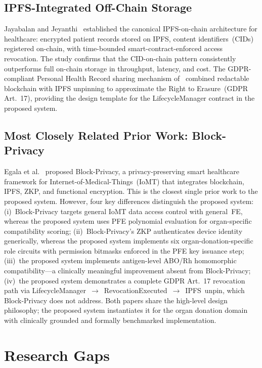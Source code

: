 \documentclass[10pt,twocolumn,a4paper]{article}
\begin{document}
\subsection{IPFS-Integrated Off-Chain Storage}

Jayabalan and Jeyanthi~\cite{jayabalan2022} established the canonical IPFS-on-chain
architecture for healthcare: encrypted patient records stored on IPFS, content
identifiers~(CIDs) registered on-chain, with time-bounded smart-contract-enforced
access revocation. The study confirms that the CID-on-chain pattern consistently
outperforms full on-chain storage in throughput, latency, and cost. The
GDPR-compliant Personal Health Record sharing mechanism of~\cite{gdprtdsc2023}
combined redactable blockchain with IPFS unpinning to approximate the Right to
Erasure~(GDPR Art.~17), providing the design template for the LifecycleManager
contract in the proposed system.

\subsection{Most Closely Related Prior Work: Block-Privacy}

Egala et al.~\cite{egala2023} proposed Block-Privacy, a privacy-preserving smart
healthcare framework for Internet-of-Medical-Things~(IoMT) that integrates
blockchain, IPFS, ZKP, and functional encryption. This is the closest single prior
work to the proposed system. However, four key differences distinguish the proposed
system: (i)~Block-Privacy targets general IoMT data access control with
general~FE, whereas the proposed system uses PFE polynomial evaluation for
organ-specific compatibility scoring; (ii)~Block-Privacy's ZKP authenticates device
identity generically, whereas the proposed system implements six organ-donation-specific
role circuits with permission bitmasks enforced in the PFE key issuance step;
(iii)~the proposed system implements antigen-level ABO/Rh homomorphic
compatibility---a clinically meaningful improvement absent from Block-Privacy;
(iv)~the proposed system demonstrates a complete GDPR Art.~17 revocation path via
LifecycleManager~$\to$~RevocationExecuted~$\to$~IPFS~unpin, which Block-Privacy
does not address. Both papers share the high-level design philosophy; the proposed
system instantiates it for the organ donation domain with clinically grounded and
formally benchmarked implementation.

\section{Research Gaps}
\label{sec:gaps}
\end{document}

